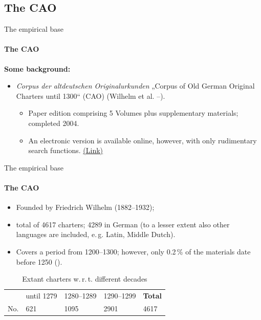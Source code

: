 \documentclass[xcolor=table, compress, %
handout
]{beamer}
\newcommand{\qu}[1]{„#1“}
\begin{document}
\subsection{The CAO}


\begin{frame}{The empirical base}
\framesubtitle{The CAO}

\textbf{Some background:}

\begin{itemize}
\item \textit{Corpus der altdeutschen Originalurkunden} \qu{Corpus of Old German Original Charters until 1300} (CAO) (Wilhelm et al. \citeyear{cao1}–\citeyear{cao5}).
\begin{itemize}
\item Paper edition comprising 5 Volumes plus supplementary materials; completed 2004.
\item An electronic version is available online, however, with only rudimentary search functions. \href{http://tcdh01.uni-trier.de/cgi-bin/iCorpus/CorpusIndex.tcl}{\alert{\tiny{(Link)}}}
\end{itemize}
\end{itemize}

\end{frame}



\begin{frame}{The empirical base}
\framesubtitle{The CAO}


\begin{itemize}
\item Founded by Friedrich Wilhelm (1882–1932);
\item total of 4617 charters; 4289 in German (to a lesser extent also other languages are included, e.\,g. Latin, Middle Dutch).
\item Covers a period from 1200–1300; however, only 0.2\,\% of the materials date before 1250 (\citealt[42]{ganslmayer09}).
\end{itemize}

\begin{table}
\begin{center}
\begin{tabular}{lllll}
\toprule
& until 1279 & 1280–1289 & 1290–1299 & \textbf{Total}\\ 
\cmidrule{1-5}
No. & 621 & 1095 & 2901 & 4617\\
\bottomrule
\end{tabular}
\caption{Extant charters w.\,r.\,t. different decades}
\end{center}
\end{table}

\end{frame}
\end{document}
